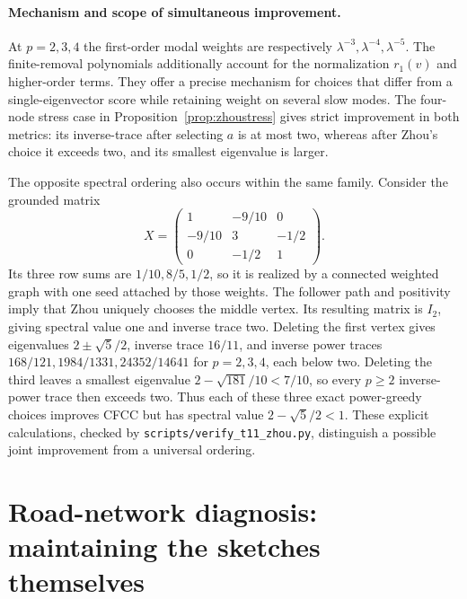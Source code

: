 \documentclass[11pt]{article}
\begin{document}
\paragraph{Mechanism and scope of simultaneous improvement.}
At $p=2,3,4$ the first-order modal weights are respectively
$\lambda^{-3},\lambda^{-4},\lambda^{-5}$. The finite-removal
polynomials additionally account for the normalization $r_1(v)$
and higher-order terms. They offer a precise mechanism for choices
that differ from a single-eigenvector score while retaining
weight on several slow modes. The four-node stress case in
Proposition~\ref{prop:zhoustress} gives strict improvement in both
metrics: its inverse-trace after selecting $a$ is at most two,
whereas after Zhou's choice it exceeds two, and its smallest
eigenvalue is larger.

The opposite spectral ordering also occurs within the same family.
Consider the grounded matrix
\[
 X=\begin{pmatrix}1&-9/10&0\\-9/10&3&-1/2\\0&-1/2&1\end{pmatrix}.
\]
Its three row sums are $1/10,8/5,1/2$, so it is realized by a
connected weighted graph with one seed attached by those weights.
The follower path and positivity imply that Zhou uniquely chooses
the middle vertex. Its resulting matrix is $I_2$, giving spectral
value one and inverse trace two. Deleting the first vertex gives
eigenvalues $2\pm\sqrt5/2$, inverse trace $16/11$, and inverse
power traces $168/121,1984/1331,24352/14641$ for $p=2,3,4$,
each below two. Deleting the third leaves a smallest eigenvalue
$2-\sqrt{181}/10<7/10$, so every $p\geq2$ inverse-power trace
then exceeds two. Thus each of these three exact power-greedy
choices improves CFCC but has spectral value $2-\sqrt5/2<1$.
These explicit calculations, checked by
\texttt{scripts/verify\_t11\_zhou.py}, distinguish a possible
joint improvement from a universal ordering.

\section{Road-network diagnosis: maintaining the sketches themselves}
\end{document}
